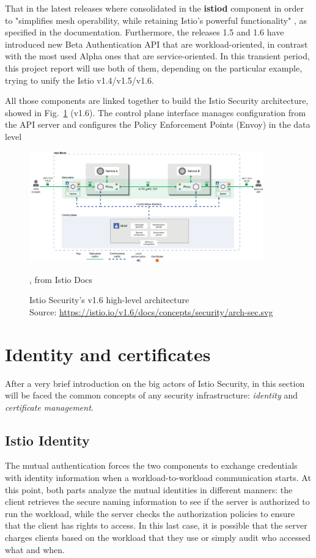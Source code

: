 That in the latest releases where consolidated in the \textbf{istiod} component in order to "simplifies mesh operability, while retaining Istio’s powerful functionality" \cite{istiod}, as specified in the documentation. Furthermore, the releases 1.5 and 1.6 have introduced new Beta Authentication API that are workload-oriented, in contrast with the most used Alpha ones that are service-oriented. In this transient period, this project report will use both of them, depending on the particular example, trying to unify the Istio v1.4/v1.5/v1.6.

All those components are linked together to build the Istio Security architecture, showed in Fig.~\ref{fig:hlarch} (v1.6). The control plane interface manages configuration from the API server and configures the Policy Enforcement Points (Envoy) in the data level

\begin{figure}
    \centering
    \includegraphics[width=0.9\textwidth]{chapters/images/chp1/arch-sec.png}
    \caption{, from Istio Docs}
    \caption[Istio Security's v1.6 high-level architecture]{Istio Security's v1.6 high-level architecture\\Source: \url{https://istio.io/v1.6/docs/concepts/security/arch-sec.svg}}
    \label{fig:hlarch}
\end{figure}

\section{Identity and certificates}
After a very brief introduction on the big actors of Istio Security, in this section will be faced the common concepts of any security infrastructure: \textit{identity} and \textit{certificate management}.

\subsection{Istio Identity}
The mutual authentication forces the two components to exchange credentials with identity information when a workload-to-workload communication starts. At this point, both parts analyze the mutual identities in different manners: the client retrieves the secure naming information to see if the server is authorized to run the workload, while the server checks the authorization policies to ensure that the client has rights to access. 
In this last case, it is possible that the server charges clients based on the workload that they use or simply audit who accessed what and when.

